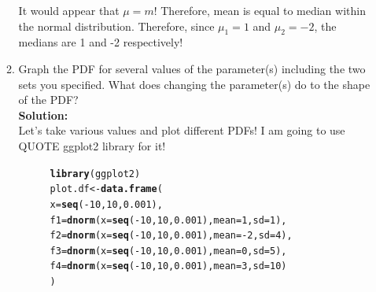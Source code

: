 \documentclass{article}\usepackage[]{graphicx}\usepackage[]{color}
\makeatletter
\newcommand{\hlnum}[1]{\textcolor[rgb]{0.686,0.059,0.569}{#1}}%
\newcommand{\hlopt}[1]{\textcolor[rgb]{0,0,0}{#1}}%
\newcommand{\hlstd}[1]{\textcolor[rgb]{0.345,0.345,0.345}{#1}}%
\newcommand{\hlkwb}[1]{\textcolor[rgb]{0.69,0.353,0.396}{#1}}%
\newcommand{\hlkwc}[1]{\textcolor[rgb]{0.333,0.667,0.333}{#1}}%
\newcommand{\hlkwd}[1]{\textcolor[rgb]{0.737,0.353,0.396}{\textbf{#1}}}%
\newenvironment{kframe}{%
 \def\at@end@of@kframe{}%
 \ifinner\ifhmode%
  \def\at@end@of@kframe{\end{minipage}}%
  \begin{minipage}{\columnwidth}%
 \fi\fi%
 \def\FrameCommand##1{\hskip\@totalleftmargin \hskip-\fboxsep
 \colorbox{shadecolor}{##1}\hskip-\fboxsep
     \hskip-\linewidth \hskip-\@totalleftmargin \hskip\columnwidth}%
 \MakeFramed {\advance\hsize-\width
   \@totalleftmargin\z@ \linewidth\hsize
   \@setminipage}}%
 {\par\unskip\endMakeFramed%
 \at@end@of@kframe}
\newenvironment{knitrout}{}{} %
\makeatother
\begin{document}
\begin{enumerate}
\begin{enumerate}
It would appear that $\mu=m!$ Therefore, mean is equal to median within the normal distribution. Therefore, since $\mu_{1}=1$ and $\mu_{2}=-2$, the medians are 1 and -2 respectively!
	\item \label{q1PDF} Graph the PDF for several values of the parameter(s) 
	including the two sets you specified. What does changing the parameter(s) do 
	to the shape of the PDF?\\
	\textbf{Solution:}\\
	Let's take various values and plot different PDFs! I am going to use QUOTE ggplot2 library for it!
\begin{figure}[H]
\begin{center}
\begin{knitrout}
\color{fgcolor}\begin{kframe}
\begin{alltt}
\hlkwd{library}\hlstd{(ggplot2)}
\hlstd{plot.df} \hlkwb{<-} \hlkwd{data.frame}\hlstd{(}
  \hlkwc{x}\hlstd{=}\hlkwd{seq}\hlstd{(}\hlopt{-}\hlnum{10}\hlstd{,} \hlnum{10}\hlstd{,} \hlnum{0.001}\hlstd{),}
  \hlkwc{f1}\hlstd{=}\hlkwd{dnorm}\hlstd{(}\hlkwc{x}\hlstd{=}\hlkwd{seq}\hlstd{(}\hlopt{-}\hlnum{10}\hlstd{,} \hlnum{10}\hlstd{,} \hlnum{0.001}\hlstd{),} \hlkwc{mean}\hlstd{=}\hlnum{1}\hlstd{,} \hlkwc{sd}\hlstd{=}\hlnum{1}\hlstd{),}
  \hlkwc{f2}\hlstd{=}\hlkwd{dnorm}\hlstd{(}\hlkwc{x}\hlstd{=}\hlkwd{seq}\hlstd{(}\hlopt{-}\hlnum{10}\hlstd{,} \hlnum{10}\hlstd{,} \hlnum{0.001}\hlstd{),} \hlkwc{mean}\hlstd{=}\hlopt{-}\hlnum{2}\hlstd{,} \hlkwc{sd}\hlstd{=}\hlnum{4}\hlstd{),}
  \hlkwc{f3}\hlstd{=}\hlkwd{dnorm}\hlstd{(}\hlkwc{x}\hlstd{=}\hlkwd{seq}\hlstd{(}\hlopt{-}\hlnum{10}\hlstd{,} \hlnum{10}\hlstd{,} \hlnum{0.001}\hlstd{),} \hlkwc{mean}\hlstd{=}\hlnum{0}\hlstd{,} \hlkwc{sd}\hlstd{=}\hlnum{5}\hlstd{),}
  \hlkwc{f4}\hlstd{=}\hlkwd{dnorm}\hlstd{(}\hlkwc{x}\hlstd{=}\hlkwd{seq}\hlstd{(}\hlopt{-}\hlnum{10}\hlstd{,} \hlnum{10}\hlstd{,} \hlnum{0.001}\hlstd{),} \hlkwc{mean}\hlstd{=}\hlnum{3}\hlstd{,} \hlkwc{sd}\hlstd{=}\hlnum{10}\hlstd{)}
\hlstd{)}


\end{alltt}
\end{kframe}
\end{knitrout}
\end{center}
\end{figure}
\end{enumerate}
\end{enumerate}
\end{document}
